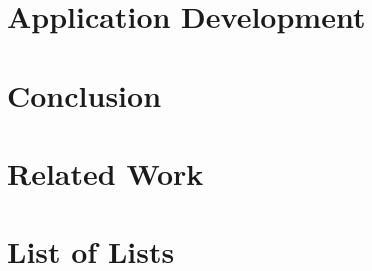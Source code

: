 \documentclass[a4paper,twoside]{book}
\begin{document}
\chapter{Application Development}\label{chap:dev}
    

\chapter{Conclusion}\label{chap:conclusion}
    

\chapter{Related Work}\label{chap:related}
    


\backmatter{}

\cleardoublepage
\nocite{*}
{}
\printbibliography[]

\printglossaries

\cleardoublepage
{}
\begingroup
\chapter{List of Lists}
\let\clearpage\relax
\let\cleardoublepage\relax
\lstlistoflistings{}
\listoffigures
\endgroup
\end{document}
